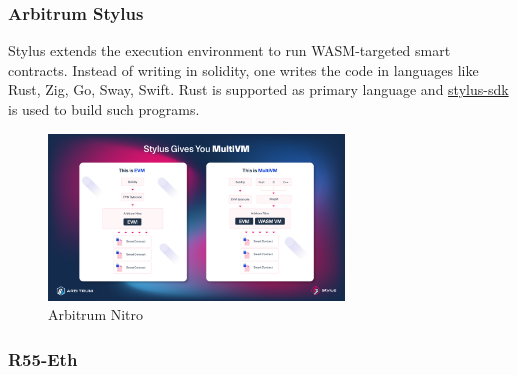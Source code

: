 \subsubsection{Arbitrum Stylus}
Stylus extends the execution environment to run WASM-targeted smart contracts. Instead of writing in solidity, one writes the code in languages like Rust, Zig, Go, Sway, Swift. Rust is supported as primary language and \href{https://docs.arbitrum.io/stylus/reference/overview}{stylus-sdk} is used to build such programs.

\begin{figure}
    \centering
    \includegraphics[width=0.70\textwidth]{general-problems/assets/arbitrum-nitro.png}
    \caption{Arbitrum Nitro}
    \label{fig:arbitrum-nitro}
\end{figure}

\subsubsection{R55-Eth}
